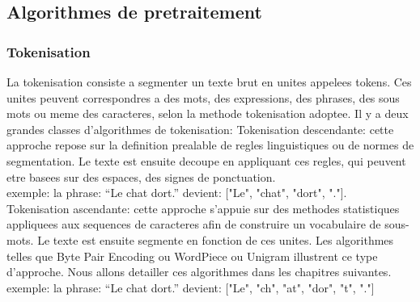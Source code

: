 \documentclass[12pt,a4paper]{report}
\begin{document}
	\subsection{Algorithmes de pretraitement}
	\subsubsection{Tokenisation}
	La tokenisation consiste a segmenter un texte brut en unites appelees tokens. Ces unites peuvent correspondres a des mots, des expressions, des phrases, des sous mots ou meme des caracteres, selon la methode tokenisation adoptee. 
	Il y a deux grandes classes d'algorithmes de tokenisation:
	Tokenisation descendante: cette approche repose sur la definition prealable de regles linguistiques ou de normes de segmentation. Le texte est ensuite decoupe en appliquant ces regles, qui peuvent etre basees sur des espaces, des signes de ponctuation.\\
	exemple: la phrase: “Le chat dort.” devient: ["Le", "chat", "dort", "."].\\
	Tokenisation ascendante: cette approche s'appuie sur des methodes statistiques appliquees aux sequences de caracteres afin de construire un vocabulaire de sous-mots. Le texte est ensuite segmente en fonction de ces unites. Les algorithmes telles que Byte Pair Encoding ou WordPiece ou Unigram illustrent ce type d'approche. Nous allons detailler ces algorithmes dans les chapitres suivantes.\\
	exemple: la phrase: “Le chat dort.” devient: ["Le", "ch", "at", "dor", "t", "."]
\end{document}
